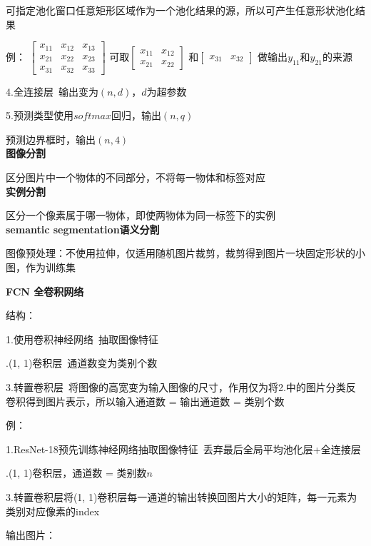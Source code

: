 \documentclass[UTF8]{ctexart}
\begin{document}
  \quad \quad 可指定池化窗口任意矩形区域作为一个池化结果的源，所以可产生任意形状池化结果

  \quad \quad 例：
    $\begin{bmatrix}
      x_{11} & x_{12} & x_{13} \\
      x_{21} & x_{22} & x_{23} \\
      x_{31} & x_{32} & x_{33}
      \end{bmatrix}$
    可取$\begin{bmatrix}
      x_{11} & x_{12} \\
      x_{21} & x_{22} 
      \end{bmatrix}$
    和$\begin{bmatrix}
      x_{31} & x_{32}
      \end{bmatrix}$
    做输出$y_{11}$和$y_{21}$的来源

  \quad 4.全连接层\ 输出变为$(n, d)$，$d$为超参数

  \quad 5.预测类型使用$softmax回归$，输出$(n, q)$

  \quad \quad 预测边界框时，输出$(n, 4)$\\
\textbf{图像分割}

  区分图片中一个物体的不同部分，不将每一物体和标签对应\\
\textbf{实例分割}

  区分一个像素属于哪一物体，即使两物体为同一标签下的实例\\
\textbf{semantic segmentation语义分割}

  图像预处理：不使用拉伸，仅适用随机图片裁剪，裁剪得到图片一块固定形状的小图，作为训练集

  \textbf{FCN 全卷积网络}

  \quad 结构：
  
  \quad \quad 1.使用卷积神经网络\ 抽取图像特征

  \quad {}.(1, 1)卷积层\ 通道数变为类别个数

  \quad \quad 3.转置卷积层\ 将图像的高宽变为输入图像的尺寸，作用仅为将2.中的图片分类反卷积得到图片表示，所以输入通道数 = 输出通道数 = 类别个数

  \quad 例：

  \quad \quad 1.ResNet-18预先训练神经网络抽取图像特征\ 丢弃最后全局平均池化层+全连接层

  \quad {}.(1, 1)卷积层，通道数 = 类别数$n$
  
  \quad \quad 3.转置卷积层将(1, 1)卷积层每一通道的输出转换回图片大小的矩阵，每一元素为类别对应像素的index

  \quad 输出图片：
  
\end{document}
